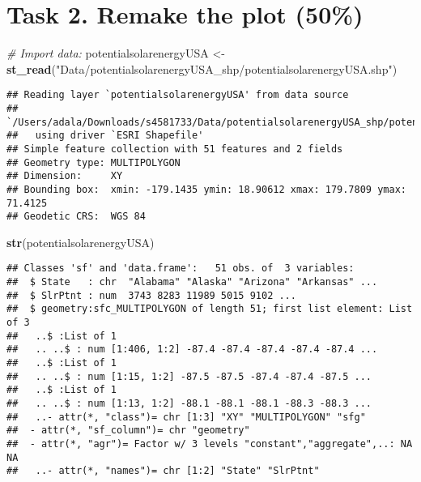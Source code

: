 \documentclass[
]{article}
\newenvironment{Shaded}{\begin{snugshade}}{\end{snugshade}}
\newcommand{\CommentTok}[1]{\textcolor[rgb]{0.56,0.35,0.01}{\textit{#1}}}
\newcommand{\FunctionTok}[1]{\textcolor[rgb]{0.13,0.29,0.53}{\textbf{#1}}}
\newcommand{\NormalTok}[1]{#1}
\newcommand{\OtherTok}[1]{\textcolor[rgb]{0.56,0.35,0.01}{#1}}
\newcommand{\StringTok}[1]{\textcolor[rgb]{0.31,0.60,0.02}{#1}}
\begin{document}
\section{Task 2. Remake the plot
(50\%)}\label{task-2.-remake-the-plot-50}

\begin{Shaded}
\begin{Highlighting}[]
\CommentTok{\# Import data:}
\NormalTok{potentialsolarenergyUSA }\OtherTok{\textless{}{-}} \FunctionTok{st\_read}\NormalTok{(}\StringTok{"Data/potentialsolarenergyUSA\_shp/potentialsolarenergyUSA.shp"}\NormalTok{)}
\end{Highlighting}
\end{Shaded}

\begin{verbatim}
## Reading layer `potentialsolarenergyUSA' from data source 
##   `/Users/adala/Downloads/s4581733/Data/potentialsolarenergyUSA_shp/potentialsolarenergyUSA.shp' 
##   using driver `ESRI Shapefile'
## Simple feature collection with 51 features and 2 fields
## Geometry type: MULTIPOLYGON
## Dimension:     XY
## Bounding box:  xmin: -179.1435 ymin: 18.90612 xmax: 179.7809 ymax: 71.4125
## Geodetic CRS:  WGS 84
\end{verbatim}

\begin{Shaded}
\begin{Highlighting}[]
\FunctionTok{str}\NormalTok{(potentialsolarenergyUSA)}
\end{Highlighting}
\end{Shaded}

\begin{verbatim}
## Classes 'sf' and 'data.frame':   51 obs. of  3 variables:
##  $ State   : chr  "Alabama" "Alaska" "Arizona" "Arkansas" ...
##  $ SlrPtnt : num  3743 8283 11989 5015 9102 ...
##  $ geometry:sfc_MULTIPOLYGON of length 51; first list element: List of 3
##   ..$ :List of 1
##   .. ..$ : num [1:406, 1:2] -87.4 -87.4 -87.4 -87.4 -87.4 ...
##   ..$ :List of 1
##   .. ..$ : num [1:15, 1:2] -87.5 -87.5 -87.4 -87.4 -87.5 ...
##   ..$ :List of 1
##   .. ..$ : num [1:13, 1:2] -88.1 -88.1 -88.1 -88.3 -88.3 ...
##   ..- attr(*, "class")= chr [1:3] "XY" "MULTIPOLYGON" "sfg"
##  - attr(*, "sf_column")= chr "geometry"
##  - attr(*, "agr")= Factor w/ 3 levels "constant","aggregate",..: NA NA
##   ..- attr(*, "names")= chr [1:2] "State" "SlrPtnt"
\end{verbatim}
\end{document}
